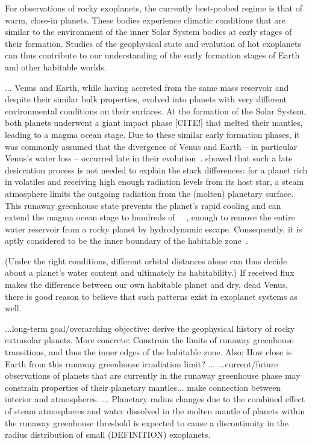 \documentclass[modern]{aastex631}
\begin{document}
\begin{note}
For observations of rocky exoplanets, the currently best-probed regime is that of warm, close-in planets.
These bodies experience climatic conditions that are similar to the environment of the inner Solar System bodies at early stages of their formation.
Studies of the geophysical state and evolution of hot exoplanets can thus contribute to our understanding of the early formation stages of Earth and other habitable worlds.

...
    Venus and Earth, while having accreted from the same mass reservoir and despite their similar bulk properties, evolved into planets with very different environmental conditions on their surfaces.
    At the formation of the Solar System, both planets underwent a giant impact phase [CITE!] that melted their mantles, leading to a magma ocean stage.
    Due to these similar early formation phases, it was commonly assumed that the divergence of Venus and Earth -- in particular Venus's water loss -- occurred late in their evolution~\citep{Elkins-Tanton2013}.
    \citet{Hamano2013} showed that such a late desiccation process is not needed to explain the stark differences: for a planet rich in volatiles and receiving high enough radiation levels from its host star, a steam atmosphere limits the outgoing radiation from the (molten) planetary surface.
    This runaway greenhouse state prevents the planet's rapid cooling and can extend the magma ocean stage to hundreds of \SI{}{\mega\year}, enough to remove the entire water reservoir from a rocky planet by hydrodynamic escape.
    Consequently, it is aptly considered to be the inner boundary of the habitable zone~\citep{Kasting1993,Kopparapu2013}.

    (Under the right conditions, different orbital distances alone can thus decide about a planet's water content and ultimately its habitability.)
    If received flux makes the difference between our own habitable planet and dry, dead Venus, there is good reason to believe that such patterns exist in exoplanet systems as well.

    ...long-term goal/overarching objective: derive the geophysical history of rocky extrasolar planets. More concrete: Constrain the limits of runaway greenhouse transitions, and thus the inner edges of the habitable zone. Also: How close is Earth from this runaway greenhouse irradiation limit?
   ...
    ...current/future observations of planets that are currently in the runaway greenhouse phase may constrain properties of their planetary mantles... make connection between interior and atmospheres.
    ...
    Planetary radius changes due to the combined effect of steam atmospheres and water dissolved in the molten mantle of planets within the runaway greenhouse threshold is expected to cause a discontinuity in the radius distribution of small (DEFINITION) exoplanets.
\end{note}
\end{document}
